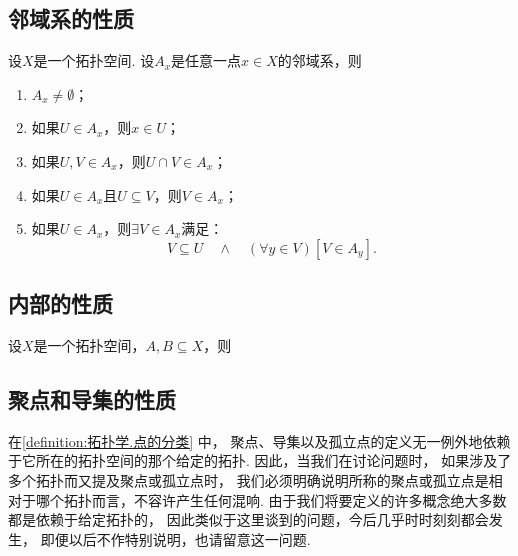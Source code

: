 \subsection{邻域系的性质}
\begin{theorem}\label{theorem:拓扑学.邻域系的基本性质}
设\(X\)是一个拓扑空间.
设\(A_x\)是任意一点\(x \in X\)的邻域系，则
\begin{enumerate}
	\item \(A_x \neq \emptyset\)；
	\item 如果\(U \in A_x\)，则\(x \in U\)；
	\item 如果\(U,V \in A_x\)，则\(U \cap V \in A_x\)；
	\item 如果\(U \in A_x\)且\(U \subseteq V\)，则\(V \in A_x\)；
	\item 如果\(U \in A_x\)，则\(\exists V \in A_x\)满足：\[
		V \subseteq U
		\quad\land\quad
		(\forall y \in V)
		[V \in A_y].
	\]
\end{enumerate}
\end{theorem}

\subsection{内部的性质}
\begin{property}
设\(X\)是一个拓扑空间，\(A,B \subseteq X\)，则
\end{property}

\subsection{聚点和导集的性质}
在\cref{definition:拓扑学.点的分类} 中，
聚点、导集以及孤立点的定义无一例外地依赖于它所在的拓扑空间的那个给定的拓扑.
因此，当我们在讨论问题时，
如果涉及了多个拓扑而又提及聚点或孤立点时，
我们必须明确说明所称的聚点或孤立点是相对于哪个拓扑而言，不容许产生任何混响.
由于我们将要定义的许多概念绝大多数都是依赖于给定拓扑的，
因此类似于这里谈到的问题，今后几乎时时刻刻都会发生，
即便以后不作特别说明，也请留意这一问题.

